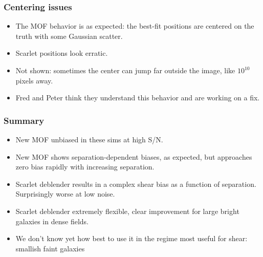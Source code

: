 \documentclass{beamer}
\begin{document}
\frame
{
    \frametitle{Centering issues}

    \begin{itemize}

        \item The MOF behavior is as expected: the best-fit positions are
            centered on the truth with some Gaussian scatter.

        \item Scarlet positions look erratic.

        \item Not shown: sometimes the center can jump far outside the image,
            like $10^10$ pixels away.

        \item Fred and Peter think they understand this behavior and are
            working on a fix.

    \end{itemize}

}


\frame
{
    \frametitle{Summary}

    \begin{itemize}
        \item New MOF unbiased in these sims at high S/N.

        \item New MOF shows separation-dependent biases, as expected, but
            approaches zero bias rapidly with increasing separation.

        \item Scarlet deblender results in a complex shear bias as 
            a function of separation.  Surprisingly worse at low
            noise.

        \item Scarlet deblender extremely flexible, clear improvement
            for large bright galaxies in dense fields.
            
        \item We don't know yet how best to use it in the regime most
            useful for shear: smallish faint galaxies

    \end{itemize}

}
\end{document}
